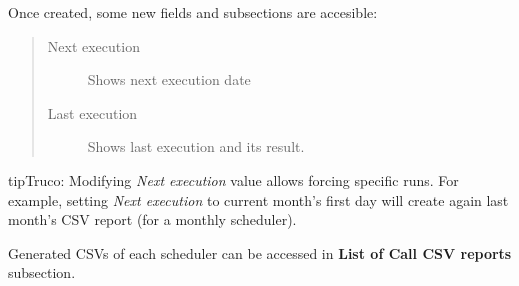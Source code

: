 \documentclass[letterpaper,10pt,spanish]{sphinxmanual}
\begin{document}
Once created, some new fields and subsections are accesible:
\begin{quote}
\begin{description}
\item[{Next execution}] \leavevmode
Shows next execution date

\item[{Last execution}] \leavevmode
Shows last execution and its result.

\end{description}
\end{quote}

\begin{notice}{tip}{Truco:}
Modifying \emph{Next execution} value allows forcing specific runs. For example, setting \emph{Next execution} to
current month's first day will create again last month's CSV report (for a monthly scheduler).
\end{notice}

Generated CSVs of each scheduler can be accessed in \textbf{List of Call CSV reports} subsection.
\end{document}
